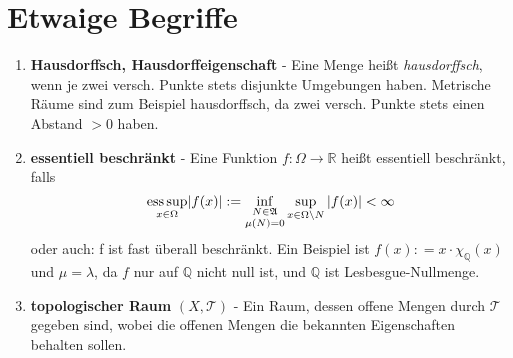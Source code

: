 \documentclass[ngerman]{report}
\theoremstyle{definition}%
\theoremstyle{myStyle}
\theoremstyle{plain}%
\newcommand{\R}{\mathbb{R}}
\newcommand{\Q}{\mathbb{Q}}
\newcommand{\hA}{\mathfrak{A}}%
\newcommand{\tT}{\mathcal{T}} %
\newcommand{\ess}{\textnormal{ess}}
\begin{document}
\section*{Etwaige Begriffe}
	\begin{enumerate}
		\item \textbf{Hausdorffsch, Hausdorffeigenschaft} - Eine Menge heißt \textit{hausdorffsch}, wenn je zwei versch. Punkte stets disjunkte Umgebungen haben. Metrische Räume sind zum Beispiel hausdorffsch, da zwei versch. Punkte stets einen Abstand $> 0$ haben.

		\item \textbf{essentiell beschränkt} - 
					Eine Funktion $f: \Omega \rightarrow \R$ heißt essentiell beschränkt, falls 
					$$\underset{x\in\Omega}{\ess \sup} |f(x)| := \underset{{\mu(N) = 0}}{ \inf_{N \in \hA} }  
					\sup_{x\in \Omega\backslash N} |f(x)| < \infty$$
					oder auch: f ist fast überall beschränkt. 
					Ein Beispiel ist $f(x) : = x\cdot \chi_\Q(x)$ und $\mu = \lambda$, da $f$ nur auf $\Q$ nicht null ist, und $\Q$ ist Lesbesgue-Nullmenge. 

		\item \textbf{topologischer Raum} $(X,\tT)$ - Ein Raum, dessen offene Mengen durch $\tT$ gegeben sind, wobei die offenen Mengen die bekannten Eigenschaften behalten sollen.
	\end{enumerate} 
\end{document}
